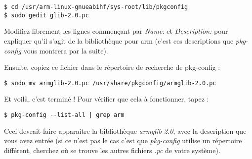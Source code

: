 \documentclass[a4paper,11pt]{article}
\begin{document}
\begin{lstlisting}
$ cd /usr/arm-linux-gnueabihf/sys-root/lib/pkgconfig
$ sudo gedit glib-2.0.pc
\end{lstlisting}

\par Modifiez librement les lignes commençant par \emph{Name:} et \emph{Description:} pour expliquer qu'il s'agit de la bibliothèque pour arm (c'est ces descriptions que \emph{pkg-config} vous montrera par la suite).
\par Ensuite, copiez ce fichier dans le répertoire de recherche de pkg-config :

\begin{lstlisting}[]
$ sudo mv armglib-2.0.pc /usr/share/pkgconfig/armglib-2.0.pc
\end{lstlisting}

\par Et voilà, c'est terminé ! Pour vérifier que cela à fonctionner, tapez :

\begin{lstlisting}[]
$ pkg-config --list-all | grep arm
\end{lstlisting}

\par Ceci devrait faire apparaitre la bibliothèque \emph{armglib-2.0}, avec la description que vous avez entrée (si ce n'est pas le cas c'est que \emph{pkg-config} utilise un répertoire différent, cherchez où se trouve les autres fichiers \emph{.pc} de votre système).
\end{document}
